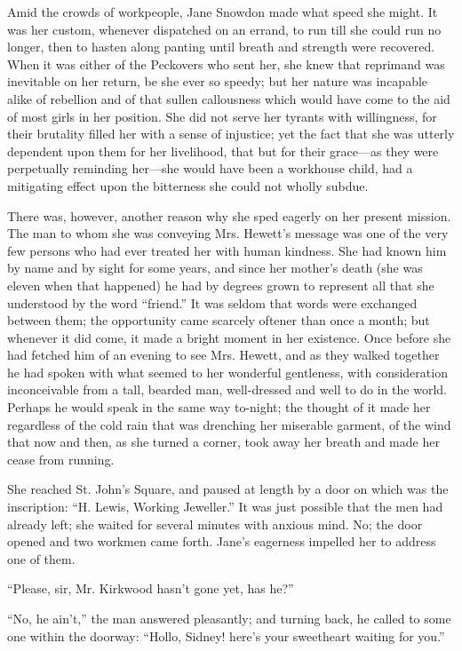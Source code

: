 Amid the crowds of workpeople, Jane Snowdon made what speed she might.
It was her custom, whenever dispatched on an errand, to run till she
could run no longer, then to hasten along panting until breath and
strength were recovered. When it was either of the Peckovers who sent
her, she knew that reprimand was inevitable on her return, be she ever
so speedy; but her nature was incapable alike of rebellion and of that
sullen callousness which would have come to the aid of most girls in her
position. She did not serve her tyrants with willingness, for their
brutality filled her with a sense of injustice; yet the fact that she
was utterly dependent upon them for her livelihood,
{\protect\hypertarget{28}{}{}}that but for their grace---as they were
perpetually reminding her---she would have been a workhouse child, had a
mitigating effect upon the bitterness she could not wholly subdue.

There was, however, another reason why she sped eagerly on her present
mission. The man to whom she was conveying Mrs. Hewett's message was one
of the very few persons who had ever treated her with human kindness.
She had known him by name and by sight for some years, and since her
mother's death (she was eleven when that happened) he had by degrees
grown to represent all that she understood by the word ``friend.'' It
was seldom that words were exchanged between them; the opportunity came
scarcely oftener than once a month; but whenever it did come, it made a
bright moment in her existence. Once before she had fetched him of an
evening to see Mrs. Hewett, and as they walked together he had spoken
with what seemed to her wonderful gentleness, with consideration
{\protect\hypertarget{29}{}{}}inconceivable from a tall, bearded man,
well-dressed and well to do in the world. Perhaps he would speak in the
same way to-night; the thought of it made her regardless of the cold
rain that was drenching her miserable garment, of the wind that now and
then, as she turned a corner, took away her breath and made her cease
from running.

She reached St. John's Square, and paused at length by a door on which
was the inscription: ``H. Lewis, Working Jeweller.'' It was just
possible that the men had already left; she waited for several minutes
with anxious mind. No; the door opened and two workmen came forth.
Jane's eagerness impelled her to address one of them.

``Please, sir, Mr. Kirkwood hasn't gone yet, has he?''

``No, he ain't,'' the man answered pleasantly; and turning back, he
called to some one within the doorway: ``Hollo, Sidney! here's your
sweetheart waiting for you.''

